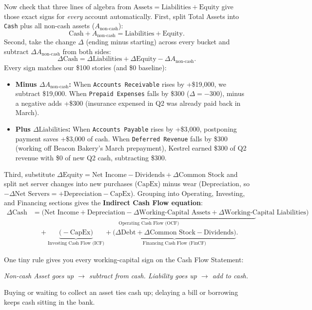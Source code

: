 Now check that three lines of algebra from $\text{Assets} = \text{Liabilities} + \text{Equity}$ give those exact signs for \emph{every} account automatically. First, split Total Assets into \texttt{Cash} plus all non-cash assets ($A_{\text{non-cash}}$):
\[
  \text{Cash} + A_{\text{non-cash}} = \text{Liabilities} + \text{Equity}.
\]
Second, take the change $\Delta$ (ending minus starting) across every bucket and subtract $\Delta A_{\text{non-cash}}$ from both sides:
\[
  \Delta\text{Cash} = \Delta\text{Liabilities} + \Delta\text{Equity} - \Delta A_{\text{non-cash}}.
\]
Every sign matches our \$100 stories (and \$0 baseline):
\begin{itemize}
  \item \textbf{Minus $\Delta A_{\text{non-cash}}$:} When \texttt{Accounts Receivable} rises by +\$19,000, we subtract \$19,000. When \texttt{Prepaid Expenses} falls by \$300 ($\Delta = -300$), minus a negative adds +\$300 (insurance expensed in Q2 was already paid back in March).
  \item \textbf{Plus $\Delta\text{Liabilities}$:} When \texttt{Accounts Payable} rises by +\$3,000, postponing payment saves +\$3,000 of cash. When \texttt{Deferred Revenue} falls by \$300 (working off Beacon Bakery's March prepayment), Kestrel earned \$300 of Q2 revenue with \$0 of new Q2 cash, subtracting \$300.
\end{itemize}

Third, substitute $\Delta\text{Equity} = \text{Net Income} - \text{Dividends} + \Delta\text{Common Stock}$ and split net server changes into new purchases ($\text{CapEx}$) minus wear ($\text{Depreciation}$, so $-\Delta\text{Net Servers} = +\text{Depreciation} - \text{CapEx}$). Grouping into Operating, Investing, and Financing sections gives the \textbf{Indirect Cash Flow equation}:
\begin{align}
  \Delta\text{Cash}
  &= \underbrace{\bigl(\text{Net Income} + \text{Depreciation} - \Delta\text{Working-Capital Assets} + \Delta\text{Working-Capital Liabilities}\bigr)}_{\text{Operating Cash Flow (OCF)}} \nonumber\\
  &\quad + \underbrace{\bigl(-\text{CapEx}\bigr)}_{\text{Investing Cash Flow (ICF)}}
   + \underbrace{\bigl(\Delta\text{Debt} + \Delta\text{Common Stock} - \text{Dividends}\bigr)}_{\text{Financing Cash Flow (FinCF)}}.
  \label{eq:indirect-cash-flow}
\end{align}

\begin{intuitionbox}
One tiny rule gives you every working-capital sign on the Cash Flow Statement:
\begin{center}
\emph{Non-cash Asset goes up $\to$ subtract from cash. \quad Liability goes up $\to$ add to cash.}
\end{center}
Buying or waiting to collect an asset ties cash up; delaying a bill or borrowing keeps cash sitting in the bank.
\end{intuitionbox}

